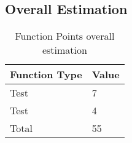 \subsection{Overall Estimation}
\blindtext

\begin{table}[h!tb]
	\centering
	\caption{Function Points overall estimation}
	\label{tab:overall_fps}
	\begin{tabular}{|l|l|}
		\hline
		Function Type		&	Value	\\ \hline
		Test				&	7	\\
		Test				&	4	\\ \hline
		Total				&	55\\
		\hline
	\end{tabular}
\end{table}

